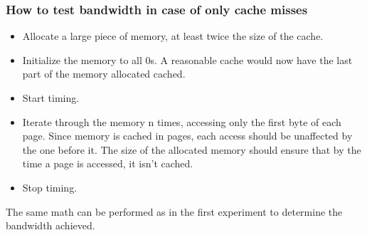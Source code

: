 \documentclass[11pt,a4paper]{article}
\begin{document}
\subsubsection{How to test bandwidth in case of only cache misses}
\begin{itemize}
    \item Allocate a large piece of memory, at least twice the size of the cache.
    \item Initialize the memory to all 0s. A reasonable cache would now have the last part of the memory allocated cached. 
    \item Start timing.
    \item Iterate through the memory n times, accessing only the first byte
          of each page. Since memory is cached in pages, each access should be
          unaffected by the one before it. The size of the allocated memory should
          ensure that by the time a page is accessed, it isn't cached.
    \item Stop timing.
\end{itemize}

The same math can be performed as in the first experiment to determine the
bandwidth achieved.
\end{document}
